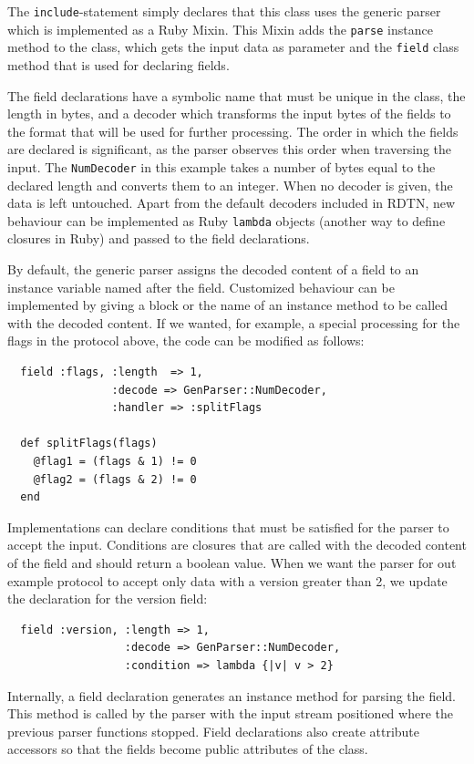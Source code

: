 \documentclass[a4paper]{article}
\begin{document}
The {\tt include}-statement simply declares that this class uses the generic
parser which is implemented as a Ruby Mixin. This Mixin adds the {\tt parse}
instance method to the class, which gets the input data as parameter and
the {\tt field} class method that is used for declaring fields.

 The field declarations have a symbolic name that must be unique in the class,
the length in bytes, and a decoder which transforms the input bytes of the
fields to the format that will be used for further processing.  The order in
which the fields are declared is significant, as the parser observes this order
when traversing the input.  The {\tt NumDecoder} in this example takes a number
of bytes equal to the declared length and converts them to an integer. When no
decoder is given, the data is left untouched. Apart from the default decoders
included in RDTN, new behaviour can be implemented as Ruby {\tt lambda} objects
(another way to define closures in Ruby) and passed to the field declarations.

By default, the generic parser assigns the decoded content of a field to an
instance variable named after the field. Customized behaviour can be implemented
by giving a block or the name of an instance method to be called with the
decoded content. If we wanted, for example, a special processing for the flags
in the protocol above, the code can be modified as follows:

\begin{verbatim}
  field :flags, :length  => 1,
                :decode => GenParser::NumDecoder,
                :handler => :splitFlags
  
  def splitFlags(flags)
    @flag1 = (flags & 1) != 0
    @flag2 = (flags & 2) != 0
  end
\end{verbatim}

Implementations can declare conditions that must be satisfied for the parser to
accept the input. Conditions are closures that are called with the decoded
content of the field and should return a boolean value.  When we want the parser
for out example protocol to accept only data with a version greater than 2, we
update the declaration for the version field:

\begin{verbatim}
  field :version, :length => 1,
                  :decode => GenParser::NumDecoder,
                  :condition => lambda {|v| v > 2}
\end{verbatim}

Internally, a field declaration generates an instance method for parsing the
field. This method is called by the parser with the input stream positioned
where the previous parser functions stopped. Field declarations also create
attribute accessors so that the fields become public attributes of the class.
\end{document}
